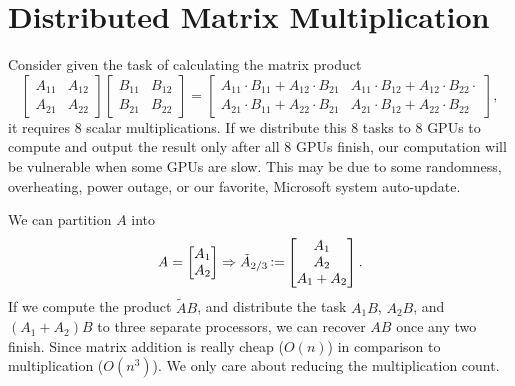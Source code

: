 \section{Distributed Matrix Multiplication}
Consider given the task of calculating the matrix product
\begin{equation*}
    \left[\begin{matrix}
        A_{11} & A_{12} \\
        A_{21} & A_{22}
    \end{matrix}\right] \left[\begin{matrix}
        B_{11} & B_{12} \\
        B_{21} & B_{22}
    \end{matrix}\right] = \left[\begin{matrix}
        A_{11}\cdot B_{11} + A_{12}\cdot B_{21} & A_{11}\cdot B_{12} + A_{12}\cdot B_{22} \cdot \\
        A_{21}\cdot B_{11} + A_{22}\cdot B_{21} & A_{21}\cdot B_{12} + A_{22}\cdot B_{22}
    \end{matrix}\right],
\end{equation*}
it requires $8$ scalar multiplications. If we distribute this $8$ tasks to $8$ GPUs to compute and output the result only after all $8$ GPUs finish, our computation will be vulnerable when some GPUs are slow. This may be due to some randomness, overheating, power outage, or our favorite, Microsoft system auto-update.

We can partition $A$ into
\begin{equation*}
    A = \left[\begin{matrix}
        A_1 \\ A_2
    \end{matrix}\right] \Rightarrow \tilde{A}_{2/3} \operatorname{\vcentcolon=} \left[\begin{matrix}
        A_1 \\ A_2 \\ A_1 + A_2
    \end{matrix}\right].
\end{equation*}
If we compute the product $\tilde{A}B$, and distribute the task $A_1B$, $A_2B$, and $(A_1+A_2)B$ to three separate processors, we can recover $AB$ once any two finish. Since matrix addition is really cheap ($O(n)$) in comparison to multiplication ($O(n^3)$). We only care about reducing the multiplication count.

